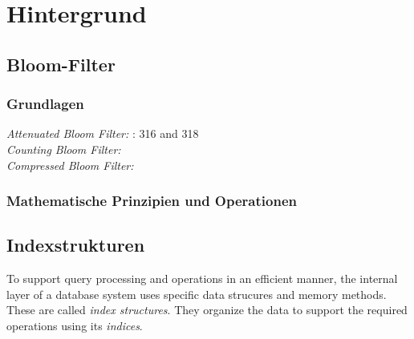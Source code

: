 \chapter{Hintergrund}\label{ch:hintergrund}

\section{Bloom-Filter}\label{sec:bloom}
\subsection{Grundlagen}\label{sec:bloom-basics}
\textit{Attenuated Bloom Filter:} \cite{Sakuma2011}: 316 and 318\\
\textit{Counting Bloom Filter:} \cite{Fan2000}\\
\textit{Compressed Bloom Filter:} \cite{Mitzenmacher2002}
\subsection{Mathematische Prinzipien und Operationen}\label{sec:mathe}
\section{Indexstrukturen}\label{sec:indexstrukturen}
To support query processing and operations in an efficient manner, the internal layer of a database system uses specific data strucures and memory methods. These are called \textit{index structures}. They organize the data to support the required operations using its \textit{indices}.

